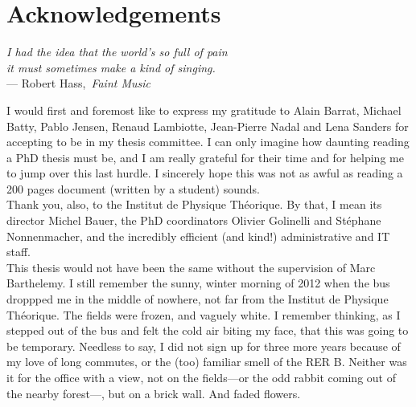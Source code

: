 


\begingroup

\let\clearpage\relax
\let\cleardoublepage\relax
\let\cleardoublepage\relax

\chapter*{Acknowledgements} %

\begin{flushright}{\slshape    
    I had the idea that the world's so full of pain \\
    it must sometimes make a kind of singing.} \\\medskip
    --- Robert Hass,\, \emph{Faint Music}~\cite{Hass:1998}
\end{flushright}


\bigskip


I would first and foremost like to express my gratitude to Alain Barrat, Michael
Batty, Pablo Jensen, Renaud Lambiotte, Jean-Pierre Nadal and Lena Sanders for accepting to be in
my thesis committee. I can only imagine how daunting reading a PhD thesis must
be, and I am really grateful for their time and for helping me to jump over this
last hurdle. I sincerely hope this was not as awful as reading a 200 pages
document (written by a student) sounds.\\

Thank you, also, to the Institut de Physique Th\'eorique. By that, I mean its
director Michel Bauer, the PhD coordinators Olivier Golinelli and St\'ephane
Nonnenmacher, and the incredibly efficient (and kind!) administrative and IT
staff.\\

This thesis would not have been the same without the supervision of Marc
Barthelemy. I still remember the sunny, winter morning of 2012 when the bus
droppped me in the middle of nowhere, not far from the Institut de Physique
Th\'eorique. The fields were frozen, and vaguely white. I remember thinking, as
I stepped out of the bus and felt the cold air biting my face, that this was
going to be temporary. Needless to say, I did not sign up for three more years
because of my love of long commutes, or the (too) familiar smell of the RER B. Neither
was it for the office with a view, not on the fields---or the odd rabbit coming
out of the nearby forest---, but on a brick wall. And faded flowers. 

